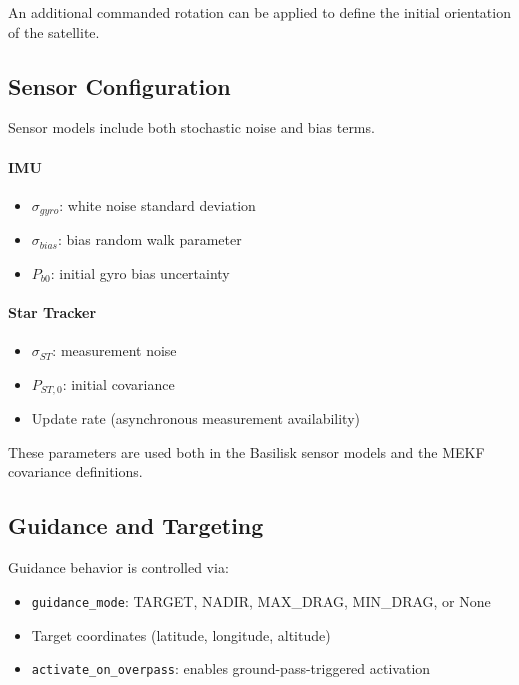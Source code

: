 An additional commanded rotation can be applied to define the initial orientation of the satellite.

\subsection{Sensor Configuration}

Sensor models include both stochastic noise and bias terms.

\paragraph{IMU}
\begin{itemize}
	\item $\sigma_{gyro}$: white noise standard deviation
	\item $\sigma_{bias}$: bias random walk parameter
	\item $P_{b0}$: initial gyro bias uncertainty
\end{itemize}

\paragraph{Star Tracker}
\begin{itemize}
	\item $\sigma_{ST}$: measurement noise
	\item $P_{ST,0}$: initial covariance
	\item Update rate (asynchronous measurement availability)
\end{itemize}

These parameters are used both in the Basilisk sensor models and the MEKF covariance definitions.

\subsection{Guidance and Targeting}

Guidance behavior is controlled via:

\begin{itemize}
	\item \texttt{guidance\_mode}: TARGET, NADIR, MAX\_DRAG, MIN\_DRAG, or None
	\item Target coordinates (latitude, longitude, altitude)
	\item \texttt{activate\_on\_overpass}: enables ground-pass-triggered activation
\end{itemize}

